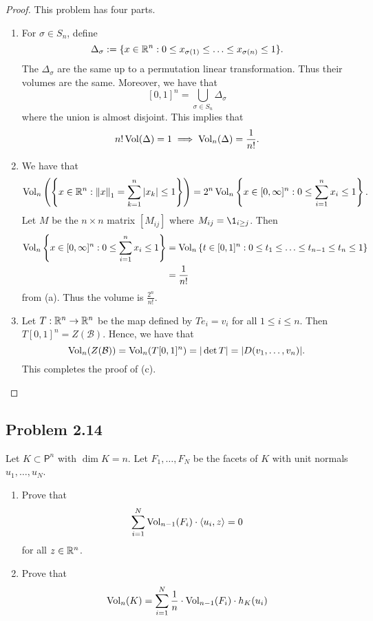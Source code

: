 \documentclass[12pt]{article}
\begin{document}
\begin{proof}
	This problem has four parts.
    	\begin{enumerate}[label = (\alph*)]
    		\item For $\sigma \in S_n$, define
    		\[
    			\Delta_\sigma := \{x \in \mathbb{R}^n : 0 \leq x_{\sigma(1)} \leq \ldots \leq x_{\sigma(n)} \leq 1\}.
    		\]
    		The $\Delta_\sigma$ are the same up to a permutation linear transformation. Thus their volumes are the same. Moreover, we have that 
    		\[
    			[0, 1]^n = \bigcup_{\sigma \in S_n} \Delta_\sigma
    		\]
    		where the union is almost disjoint. This implies that 
    		\[
    			n! \operatorname{Vol}(\Delta) = 1 \implies \operatorname{Vol}_n(\Delta) = \frac{1}{n!}. 
    		\] 
    		\item We have that 
    		\[
    			\operatorname{Vol}_n \left ( \left \{ x \in \mathbb{R}^n : \left\lVert x\right\rVert_1 = \sum_{k = 1}^n |x_k| \leq 1 \right \} \right ) = 2^n \operatorname{Vol}_n \left \{ x \in [0, \infty]^n : 0 \leq \sum_{i = 1}^n x_i \leq 1\right \}.
    		\]
    		Let $M$ be the $n \times n$ matrix $[M_{ij}]$ where $M_{ij} = \1_{i \geq j}$. Then 
    		\begin{align*}
    			\operatorname{Vol}_n \left \{ x \in [0, \infty]^n : 0 \leq \sum_{i = 1}^n x_i \leq 1\right \} & = \operatorname{Vol}_n \left \{t \in [0, 1]^n : 0 \leq t_1 \leq \ldots \leq t_{n-1} \leq t_n \leq 1 \right \} \\
    			& = \frac{1}{n!}	
    		\end{align*}
    		from (a). Thus the volume is $\frac{2^n}{n!}$.

    		\item Let $T : \mathbb{R}^n \to \mathbb{R}^n$ be the map defined by $Te_i = v_i$ for all $1 \leq i \leq n$. Then $T[0, 1]^n = Z(\mathcal{B})$. Hence, we have that 
    		\[
    			\operatorname{Vol}_n(Z(\mathcal{B})) = \operatorname{Vol}_n(T[0, 1]^n) = |\det T| = |D(v_1, \ldots, v_n)|.
    		\]
    		This completes the proof of (c). 
    	\end{enumerate}
\end{proof}

\newpage 

\subsection{Problem 2.14}

\begin{problem}
	Let $K \subset \mathsf{P}^n$ with $\dim K = n$. Let $F_1, \ldots, F_N$ be the facets of $K$ with unit normals $u_1, \ldots, u_N$.
    \begin{enumerate}[label = (\alph*)]
        \item Prove that 
        \[
            \sum_{i = 1}^N \operatorname{Vol}_{n-1}(F_i) \cdot \langle u_i, z \rangle = 0
        \]
        for all $z \in \mathbb{R}^n$. 

        \item Prove that 
        \[
            \operatorname{Vol}_n(K) = \sum_{i = 1}^N \frac{1}{n} \cdot \operatorname{Vol}_{n-1}(F_i) \cdot h_K(u_i)
        \]
    \end{enumerate}
\end{problem}
\end{document}
